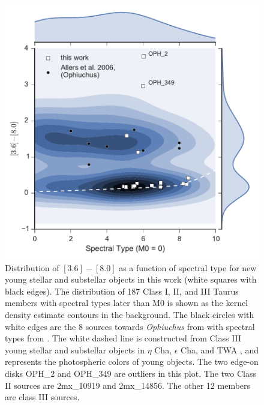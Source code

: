 \documentclass[12pt,preprint]{aastex}
\begin{document}
\begin{figure}[ht!]
  \caption{ Distribution of $[3.6]-[8.0]$ as a function of spectral type for new young stellar and substellar objects in this work (white squares with black edges).  The distribution of 187 Class I, II, and III Taurus members with spectral types later than M0 \citep{2010ApJS..186..111L} is shown as the kernel density estimate contours in the background.  The black circles with white edges are the 8 sources towards \emph{Ophiuchus} from \citet{allers06} with spectral types from \citet{2011ASPC..448..633G}.  The white dashed line is constructed from Class III young stellar and substellar objects in $\eta$ Cha, $\epsilon$ Cha, and TWA \citep{2010ApJS..186..111L}, and represents the photospheric colors of young objects.  The two edge-on disks OPH\_2 and OPH\_349 are outliers in this plot.  The two Class II sources are 2mx\_10919 and 2mx\_14856.  The other 12 members are class III sources.  \label{fig_I1_I4_density} }
\centering
\includegraphics[scale=0.6]{figures/I1_I4_density.pdf}
\end{figure}
\end{document}
